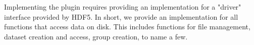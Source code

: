 Implementing the plugin requires providing an implementation for a "driver" interface provided by HDF5. In short, we provide an implementation for all functions that access data on disk. This includes functions for file management, dataset creation and access, group creation, to name a few.


